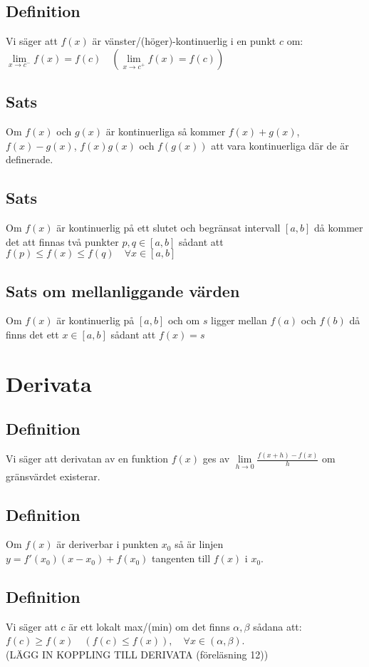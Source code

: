 \documentclass{article}
\begin{document}
\subsection{Definition}
Vi säger att $f(x)$ är vänster/(höger)-kontinuerlig i en punkt $c$ om: $\lim\limits_{x\to c^{-}} f(x)=f(c) \quad (\lim\limits_{x\to c^{+}} f(x)=f(c))$

\subsection{Sats}
Om $f(x)$ och $g(x)$ är kontinuerliga så kommer $f(x)+g(x)$, $f(x)-g(x)$, $f(x)g(x)$ och $f(g(x))$ att vara kontinuerliga där de är definerade.

\subsection{Sats}
Om $f(x)$ är kontinuerlig på ett slutet och begränsat intervall  $[a,b]$ då kommer det att finnas två punkter $p,q\in [a,b]$ sådant att $f(p)\leq f(x)\leq f(q) \quad \forall x\in [a,b]$

\subsection{Sats om mellanliggande värden}
Om $f(x)$ är kontinuerlig på $[a,b]$ och om $s$ ligger mellan $f(a)$ och $f(b)$ då finns det ett $x\in [a,b]$ sådant att $f(x)=s$

\section{Derivata}
\subsection{Definition}
Vi säger att derivatan av en funktion $f(x)$ ges av $\lim\limits_{h\to  0}\frac{f(x+h)-f(x)}{h}$ om gränsvärdet existerar.

\subsection{Definition}
Om $f(x)$ är deriverbar i punkten $x_{0}$ så är linjen $y=f'(x_{0})(x-x_{0})+f(x_{0})$ tangenten till $f(x)$ i $x_{0}$.

\subsection{Definition}
Vi säger att $c$ är ett lokalt max/(min) om det finns $\alpha,\beta$ sådana att:\\ $f(c)\geq f(x)\quad (f(c)\leq f(x)),\quad \forall x \in (\alpha, \beta)$.\\
(LÄGG IN KOPPLING TILL DERIVATA (föreläsning 12))
\end{document}
